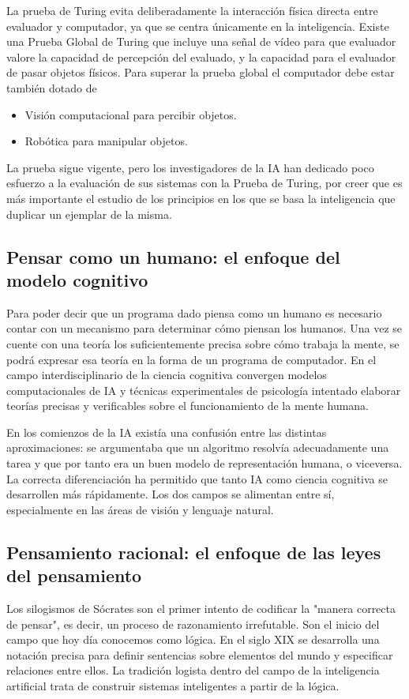 \documentclass[12pt,a4paper]{article}
\begin{document}
La prueba de Turing evita deliberadamente la interacción física directa entre evaluador y computador, ya que se centra únicamente en la inteligencia. Existe una Prueba Global de Turing que incluye una señal de vídeo para que evaluador valore la capacidad de percepción del evaluado, y la capacidad para el evaluador de pasar objetos físicos. Para superar la prueba global el computador debe estar también dotado de

\begin{itemize}
\item Visión computacional para percibir objetos.
\item Robótica para manipular objetos.
\end{itemize}

La prueba sigue vigente, pero los investigadores de la IA han dedicado poco esfuerzo a la evaluación de sus sistemas con la Prueba de Turing, por creer que es más importante el estudio de los principios en los que se basa la inteligencia que duplicar un ejemplar de la misma.

\subsection{Pensar como un humano: el enfoque del modelo cognitivo}
Para poder decir que un programa dado piensa como un humano es necesario contar con un mecanismo para determinar cómo piensan los humanos. Una vez se cuente con una teoría los suficientemente precisa sobre cómo trabaja la mente, se podrá expresar esa teoría en la forma de un programa de computador. En el campo interdisciplinario de la ciencia cognitiva convergen modelos computacionales de IA y técnicas experimentales de psicología intentado elaborar teorías precisas y verificables sobre el funcionamiento de la mente humana.

En los comienzos de la IA existía una confusión entre las distintas aproximaciones: se argumentaba que un algoritmo resolvía adecuadamente una tarea y que por tanto era un buen modelo de representación humana, o viceversa. La correcta diferenciación ha permitido que tanto IA como ciencia cognitiva se desarrollen más rápidamente. Los dos campos se alimentan entre sí, especialmente en las áreas de visión y lenguaje natural.

\subsection{Pensamiento racional: el enfoque de las leyes del pensamiento}
Los silogismos de Sócrates son el primer intento de codificar la "manera correcta de pensar", es decir, un proceso de razonamiento irrefutable. Son el inicio del campo que hoy día conocemos como lógica. En el siglo XIX se desarrolla una notación precisa para definir sentencias sobre elementos del mundo y especificar relaciones entre ellos. La tradición logista dentro del campo de la inteligencia artificial trata de construir sistemas inteligentes a partir de la lógica.
\end{document}
